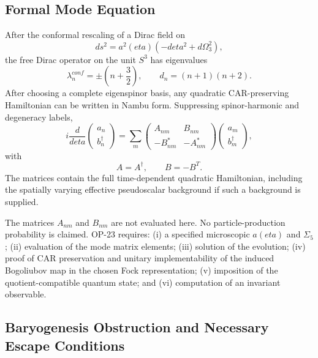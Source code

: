 \documentclass[11pt]{article}
\theoremstyle{canonmath}
\theoremstyle{canonpostulate}
\theoremstyle{canonclaim}
\def\mathrm#1{#1}%
\def\eta{eta}%
\begin{document}
\subsection{Formal Mode Equation}

After the conformal rescaling of a Dirac field on
\begin{equation}
ds^2=a^2(\eta)\left(-d\eta^2+d\Omega_3^2\right),
\end{equation}
the free Dirac operator on the unit $S^3$ has eigenvalues
\begin{equation}
\lambda_n^{\mathrm{conf}}=\pm\left(n+\frac32\right),
\qquad
d_n=(n+1)(n+2).
\end{equation}
After choosing a complete eigenspinor basis, any quadratic CAR-preserving Hamiltonian can be written in Nambu form. Suppressing spinor-harmonic and degeneracy labels,
\begin{equation}
i\frac{d}{d\eta}
\begin{pmatrix}
 a_n\\ b_n^\dagger
\end{pmatrix}
=
\sum_m
\begin{pmatrix}
 A_{nm} & B_{nm}\\
 -B_{nm}^* & -A_{nm}^*
\end{pmatrix}
\begin{pmatrix}
 a_m\\ b_m^\dagger
\end{pmatrix},
\label{eq:nambu}
\end{equation}
with
\begin{equation}
A=A^\dagger,
\qquad
B=-B^T.
\end{equation}
The matrices contain the full time-dependent quadratic Hamiltonian, including the spatially varying effective pseudoscalar background if such a background is supplied.

\begin{keyresult}
The matrices $A_{nm}$ and $B_{nm}$ are not evaluated here. No particle-production probability is claimed. OP-23 requires: (i) a specified microscopic $a(\eta)$ and $\Sigma_5$; (ii) evaluation of the mode matrix elements; (iii) solution of the evolution; (iv) proof of CAR preservation and unitary implementability of the induced Bogoliubov map in the chosen Fock representation; (v) imposition of the quotient-compatible quantum state; and (vi) computation of an invariant observable.
\end{keyresult}

\subsection{Baryogenesis Obstruction and Necessary Escape Conditions}
\end{document}
